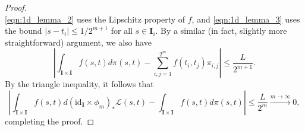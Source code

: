 \documentclass[10pt,a4paper]{amsart}
\begin{document}
\begin{proof}
\begin{equation*}
    \end{equation*}
    \eqref{eqn:1d_lemma_2} uses the Lipschitz property of $f$, and \eqref{eqn:1d_lemma_3} uses the bound $|s-t_i| \leq 1/2^{m+1}$ for all $s \in \mathbf{I}_i$. By a similar (in fact, slightly more straightforward) argument, we also have 
    \[
    \left|\int_{\mathbf{I} \times \mathbf{I}} f(s,t) d\pi (s,t) - \sum_{i,j=1}^{2^m} f(t_i,t_j)\pi_{i,j} \right| \leq \frac{L}{2^{m+1}}.
    \]
    By the triangle inequality, it follows that 
    \[
    \left| \int_{\mathbf{I} \times \mathbf{I}} f(s,t) d(\mathrm{id}_\mathbf{I} \times \phi_m)_\ast \mathscr{L}(s,t) - \int_{\mathbf{I} \times \mathbf{I}} f(s,t) d\pi (s,t)\right| \leq \frac{L}{2^m} \xrightarrow{m \to \infty} 0,
    \]
    completing the proof.
\end{proof}
\end{document}
